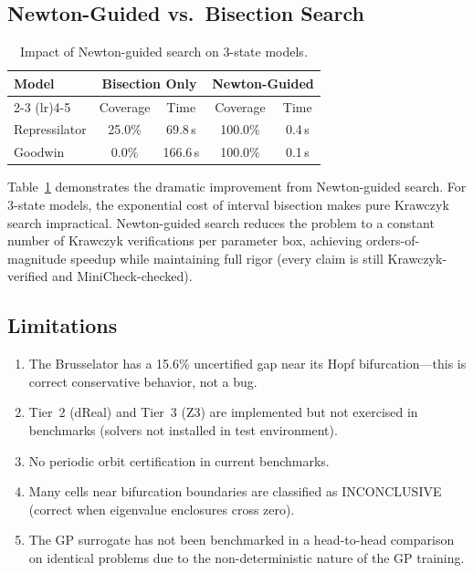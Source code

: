 \documentclass[11pt]{article}
\begin{document}
\subsection{Newton-Guided vs.\ Bisection Search}

\begin{table}[t]
\centering
\caption{Impact of Newton-guided search on 3-state models.}
\label{tab:newton}
\small
\begin{tabular}{@{}lcccc@{}}
\toprule
Model & \multicolumn{2}{c}{Bisection Only} & \multicolumn{2}{c}{Newton-Guided} \\
\cmidrule(lr){2-3} \cmidrule(lr){4-5}
 & Coverage & Time & Coverage & Time \\
\midrule
Repressilator & 25.0\% & 69.8\,s & 100.0\% & 0.4\,s \\
Goodwin       & 0.0\%  & 166.6\,s & 100.0\% & 0.1\,s \\
\bottomrule
\end{tabular}
\end{table}

Table~\ref{tab:newton} demonstrates the dramatic improvement from Newton-guided search.
For 3-state models, the exponential cost of interval bisection makes pure Krawczyk search impractical.
Newton-guided search reduces the problem to a constant number of Krawczyk verifications per parameter box, achieving orders-of-magnitude speedup while maintaining full rigor (every claim is still Krawczyk-verified and MiniCheck-checked).

\subsection{Limitations}

\begin{enumerate}[leftmargin=*]
\item The Brusselator has a 15.6\% uncertified gap near its Hopf bifurcation---this is correct conservative behavior, not a bug.
\item Tier~2 (dReal) and Tier~3 (Z3) are implemented but not exercised in benchmarks (solvers not installed in test environment).
\item No periodic orbit certification in current benchmarks.
\item Many cells near bifurcation boundaries are classified as INCONCLUSIVE (correct when eigenvalue enclosures cross zero).
\item The GP surrogate has not been benchmarked in a head-to-head comparison on identical problems due to the non-deterministic nature of the GP training.
\end{enumerate}
\end{document}
